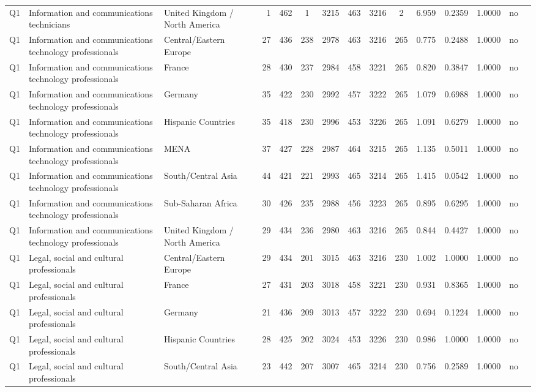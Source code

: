 \begin{longtable}{lllrcccccccccll}
Q1 & Information and communications technicians & United Kingdom / North America & 1 & 462 & 1 & 3215 & 463 & 3216 & 2 & 6.959 & 0.2359 & 1.0000 & no \\
Q1 & Information and communications technology professionals & Central/Eastern Europe & 27 & 436 & 238 & 2978 & 463 & 3216 & 265 & 0.775 & 0.2488 & 1.0000 & no \\
Q1 & Information and communications technology professionals & France & 28 & 430 & 237 & 2984 & 458 & 3221 & 265 & 0.820 & 0.3847 & 1.0000 & no \\
Q1 & Information and communications technology professionals & Germany & 35 & 422 & 230 & 2992 & 457 & 3222 & 265 & 1.079 & 0.6988 & 1.0000 & no \\
Q1 & Information and communications technology professionals & Hispanic Countries & 35 & 418 & 230 & 2996 & 453 & 3226 & 265 & 1.091 & 0.6279 & 1.0000 & no \\
Q1 & Information and communications technology professionals & MENA & 37 & 427 & 228 & 2987 & 464 & 3215 & 265 & 1.135 & 0.5011 & 1.0000 & no \\
Q1 & Information and communications technology professionals & South/Central Asia & 44 & 421 & 221 & 2993 & 465 & 3214 & 265 & 1.415 & 0.0542 & 1.0000 & no \\
Q1 & Information and communications technology professionals & Sub-Saharan Africa & 30 & 426 & 235 & 2988 & 456 & 3223 & 265 & 0.895 & 0.6295 & 1.0000 & no \\
Q1 & Information and communications technology professionals & United Kingdom / North America & 29 & 434 & 236 & 2980 & 463 & 3216 & 265 & 0.844 & 0.4427 & 1.0000 & no \\
Q1 & Legal, social and cultural professionals & Central/Eastern Europe & 29 & 434 & 201 & 3015 & 463 & 3216 & 230 & 1.002 & 1.0000 & 1.0000 & no \\
Q1 & Legal, social and cultural professionals & France & 27 & 431 & 203 & 3018 & 458 & 3221 & 230 & 0.931 & 0.8365 & 1.0000 & no \\
Q1 & Legal, social and cultural professionals & Germany & 21 & 436 & 209 & 3013 & 457 & 3222 & 230 & 0.694 & 0.1224 & 1.0000 & no \\
Q1 & Legal, social and cultural professionals & Hispanic Countries & 28 & 425 & 202 & 3024 & 453 & 3226 & 230 & 0.986 & 1.0000 & 1.0000 & no \\
Q1 & Legal, social and cultural professionals & South/Central Asia & 23 & 442 & 207 & 3007 & 465 & 3214 & 230 & 0.756 & 0.2589 & 1.0000 & no \\

\end{longtable}

